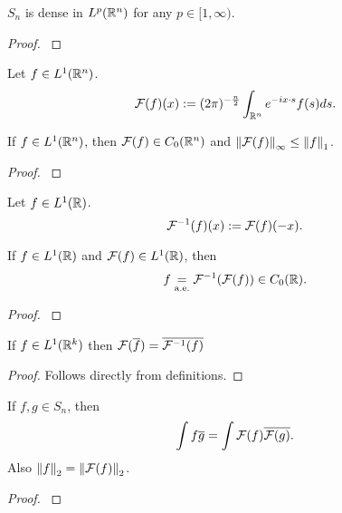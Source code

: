 \documentclass[main.tex]{subfiles}
\begin{document}
\begin{theorem}
\label{schwartz-dense-in-Lp}
$S_n$ is dense in $L^p(\mathbb{R}^n)$ for any $p\in[1, \infty)$. 
\end{theorem}
\begin{proof}
\cite[see][3.2 Fourier Transform]{miklavcic1998}
\end{proof}
\begin{definition}
\label{multi-fourier-transform}
Let $f\in L^1(\mathbb{R}^n)$.
\begin{equation}
\mathcal{F}(f)(x) := (2\pi)^{-\frac{n}{2}}\int_{\mathbb{R}^n} e^{-ix\cdot s}f(s)ds.
\end{equation}
\end{definition}
\begin{theorem}
If $f\in L^1(\mathbb{R}^n)$, then $\mathcal{F}(f)\in C_0(\mathbb{R}^n)$ and $\norm{\mathcal{F}(f)}_{\infty}\leq \norm{f}_1$.
\end{theorem}
\begin{proof}
\cite[see][II.7 Fourier Transforms]{rudin1991}
\end{proof}
\begin{definition}
Let $f\in L^1(\mathbb{R})$.
\begin{equation}
\mathcal{F}^{-1}(f)(x) := \mathcal{F}(f)(-x).
\end{equation}
\end{definition}
\begin{theorem}
If $f\in L^1(\mathbb{R})$ and $\mathcal{F}(f)\in L^1(\mathbb{R})$, then 
\begin{equation}
f \underset{\text{a.e.}}{=} \mathcal{F}^{-1}(\mathcal{F}(f)) \in C_0(\mathbb{R}).
\end{equation}
\end{theorem}
\begin{proof}
\cite[see][II.7 Fourier Transforms]{rudin1991}
\end{proof}
\begin{theorem}
\label{fourier-complex-conjugate}
If $f\in L^1(\mathbb{R}^k)$ then $\mathcal{F}(\overline{f}) = \overline{\mathcal{F}^{-1}(f)}$ 
\end{theorem}
\begin{proof}
Follows directly from definitions.
\end{proof}
\begin{theorem}
\label{perserval-multi}
If $f,g\in S_n$, then 
\begin{equation}
\int f\overline{g} = \int \mathcal{F}(f) \overline{\mathcal{F}(g)}.
\end{equation}
Also $\norm{f}_2 = \norm{\mathcal{F}(f)}_2$.
\end{theorem}
\begin{proof}
\cite[see][3.2 Fourier Transform]{miklavcic1998}
\end{proof}
\end{document}
